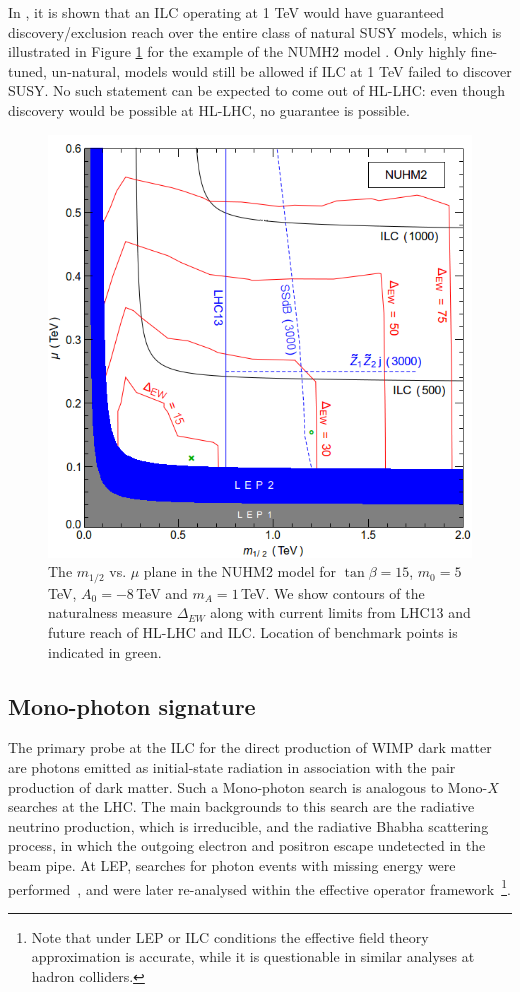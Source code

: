 In \cite{Baer:2016usl},
it is shown that an ILC operating at 1 TeV
would have guaranteed discovery/exclusion reach over the
entire class of natural SUSY models, which is illustrated
in Figure \ref{fig:searches_nuhm2_excl} for the example of the NUMH2 model
\cite{Baer:2005bu}.
Only highly fine-tuned, un-natural, models would still be allowed if ILC at 1 TeV
failed to discover SUSY.
No such statement can be expected to come out of HL-LHC:
even though discovery would be possible at HL-LHC,
no guarantee is possible.
\begin{figure}[]
  \begin{center}
      \includegraphics[width=0.45\linewidth] {chapters/figures//mumhfMEXT}
  \end{center}
  \caption{\label{fig:searches_nuhm2_excl} The $m_{1/2}$ vs. $\mu$ plane in the 
NUHM2 model for $\tan\beta =15$, 
$m_0=5$\,TeV, $A_0=-8$\,TeV and $m_A=1$\,TeV. We show contours of the
naturalness measure $\Delta_{EW}$ \cite{Baer:2015rja}
along with current limits from LHC13 and future reach of HL-LHC and ILC.
Location of benchmark points is indicated in green.} 
\end{figure}


\subsection{Mono-photon signature}
\label{subsec:searches_monophoton}

The primary probe at the ILC for the direct production of WIMP dark matter are photons
emitted as initial-state radiation in association with the pair production of dark matter.
Such a Mono-photon search is analogous  to Mono-$X$ searches at the LHC.
The main backgrounds to this search are the radiative neutrino production, which is irreducible,
and the radiative Bhabha scattering process, in which the outgoing electron and positron escape 
undetected in the beam pipe.
At LEP, searches for photon events with missing energy were performed~\cite{Abdallah:2003np,*Abdallah:2008aa},
and were later re-analysed within the  effective
operator framework~\cite{Fox:2011fx}\footnote{Note that under LEP or ILC conditions the 
effective field theory approximation is accurate, while it is questionable
in similar analyses at hadron colliders. 
}.

